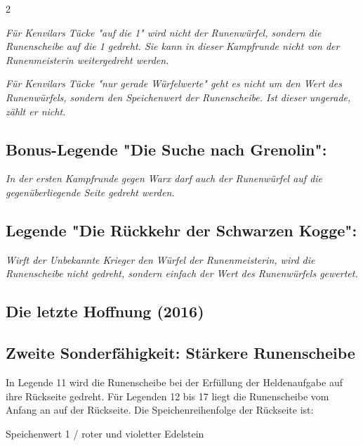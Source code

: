 \documentclass[10pt, a4paper, oneside]{book}
\newcommand{\fan}[1]{\textit{#1}}
\begin{document}
\begin{multicols*}{2}
\begin{bgcolor}
\fan{Für Kenvilars Tücke "auf die 1" wird nicht der Runenwürfel, sondern die Runenscheibe auf die 1 gedreht. Sie kann in dieser Kampfrunde nicht von der Runenmeisterin weitergedreht werden.}
\supercite{15179}

\fan{Für Kenvilars Tücke "nur gerade Würfelwerte" geht es nicht um den Wert des Runenwürfels, sondern den Speichenwert der Runenscheibe. Ist dieser ungerade, zählt er nicht.}



\subsection{Bonus-Legende "Die Suche nach Grenolin":}

\fan{In der ersten Kampfrunde gegen Warx darf auch der Runenwürfel auf die gegenüberliegende Seite gedreht werden.}



\subsection{Legende "Die Rückkehr der Schwarzen Kogge":}

\fan{Wirft der Unbekannte Krieger den Würfel der Runenmeisterin, wird die Runenscheibe nicht gedreht, sondern einfach der Wert des Runenwürfels gewertet.}

\end{bgcolor}



\columnbreak


\begin{bgcolor}
\section{Die letzte Hoffnung (2016)}


\subsection{Zweite Sonderfähigkeit: Stärkere Runenscheibe}

In Legende 11 wird die Runenscheibe bei der Erfüllung der Heldenaufgabe auf ihre Rückseite gedreht.\supercite{MH11:Heldenkarte_Runenmeisterin} Für Legenden 12 bis 17 liegt die Runenscheibe vom Anfang an auf der Rückseite.\supercite{MH:Begleitheft} Die Speichenreihenfolge der Rückseite ist:

\bullet{} Speichenwert 1 / roter und violetter Edelstein


\end{bgcolor}
\end{multicols*}
\end{document}
